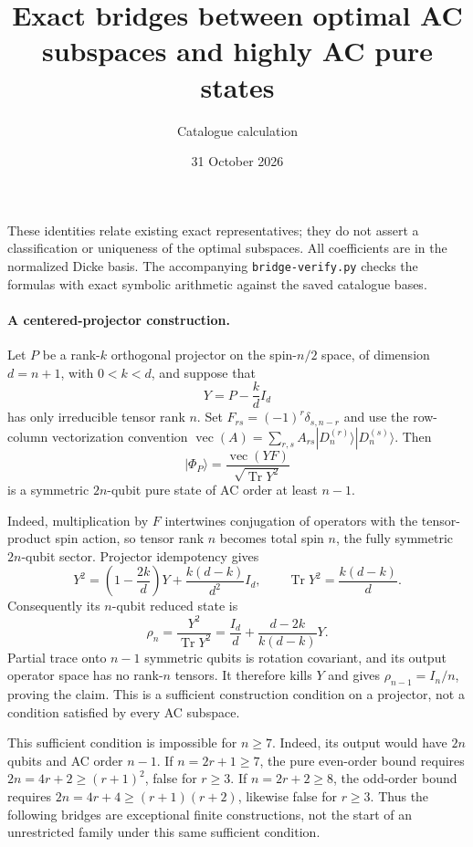 \documentclass[11pt]{article}
\newcommand{\D}[2]{|D_{#1}^{(#2)}\rangle}
\begin{document}
\title{Exact bridges between optimal AC subspaces and highly AC pure states}
\author{Catalogue calculation}\date{31 October 2026}\maketitle

These identities relate existing exact representatives; they do not assert a
classification or uniqueness of the optimal subspaces. All coefficients are in
the normalized Dicke basis. The accompanying \texttt{bridge-verify.py} checks
the formulas with exact symbolic arithmetic against the saved catalogue bases.

\paragraph{A centered-projector construction.}
Let $P$ be a rank-$k$ orthogonal projector on the spin-$n/2$ space, of
dimension $d=n+1$, with $0<k<d$, and suppose that
\[
Y=P-\frac{k}{d}I_d
\]
has only irreducible tensor rank $n$. Set
$F_{rs}=(-1)^r\delta_{s,n-r}$ and use the row-column vectorization convention
$\operatorname{vec}(A)=\sum_{r,s}A_{rs}\D{n}{r}\D{n}{s}$. Then
\[
|\Phi_P\rangle=\frac{\operatorname{vec}(YF)}{\sqrt{\operatorname{Tr}Y^2}}
\]
is a symmetric $2n$-qubit pure state of AC order at least $n-1$.

Indeed, multiplication by $F$ intertwines conjugation of operators with the
tensor-product spin action, so tensor rank $n$ becomes total spin $n$, the
fully symmetric $2n$-qubit sector. Projector idempotency gives
\[
Y^2=\left(1-\frac{2k}{d}\right)Y+\frac{k(d-k)}{d^2}I_d,
\qquad \operatorname{Tr}Y^2=\frac{k(d-k)}d.
\]
Consequently its $n$-qubit reduced state is
\[
\rho_n=\frac{Y^2}{\operatorname{Tr}Y^2}
=\frac{I_d}{d}+\frac{d-2k}{k(d-k)}Y.
\]
Partial trace onto $n-1$ symmetric qubits is rotation covariant, and its
output operator space has no rank-$n$ tensors. It therefore kills $Y$ and
gives $\rho_{n-1}=I_n/n$, proving the claim. This is a sufficient
construction condition on a projector, not a condition satisfied by every
AC subspace.

This sufficient condition is impossible for $n\ge7$. Indeed, its output
would have $2n$ qubits and AC order $n-1$. If $n=2r+1\ge7$, the pure
even-order bound requires $2n=4r+2\ge(r+1)^2$, false for $r\ge3$.
If $n=2r+2\ge8$, the odd-order bound requires
$2n=4r+4\ge(r+1)(r+2)$, likewise false for $r\ge3$.
Thus the following bridges are exceptional finite constructions, not the
start of an unrestricted family under this same sufficient condition.
\end{document}
